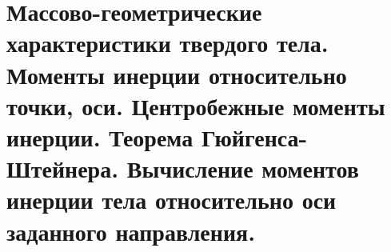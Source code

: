 \chapter{Массово-геометрические характеристики твердого тела. Моменты инерции
относительно точки, оси. Центробежные моменты инерции. Теорема
Гюйгенса-Штейнера. Вычисление моментов инерции тела относительно оси
заданного направления.}

\newpage
